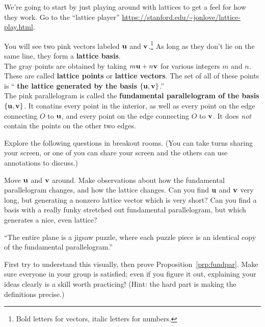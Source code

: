 \noindent
We're going to start by just playing around with lattices to get a feel for how they work. Go to the ``lattice player'' \url{https://stanford.edu/~jonlove/lattice-play.html}.

\begin{defns}
	You will see two pink vectors labeled {\color{magenta}$\mathbf{u}$} and {\color{magenta}$\mathbf{v}$}.\footnote{Bold letters for vectors, italic letters for numbers.} As long as they don't lie on the same line, they form a \textbf{\color{magenta} lattice basis}.
	\\
	
	The gray points are obtained by taking $m\mathbf{u}+n\mathbf{v}$ for various integers $m$ and $n$. These are called \textbf{\color{gray} lattice points} or \textbf{\color{gray} lattice vectors}. The set of all of these points is ``\textbf{\color{gray} the lattice generated by \color{magenta} the basis $\{\mathbf{u},\mathbf{v}\}$}.''
	\\
	
	The pink parallelogram is called the \textbf{\color{magenta} fundamental parallelogram of the basis $\{\mathbf{u},\mathbf{v}\}$}. It conatins every point in the interior, as well as every point on the edge connecting $O$ to $\mathbf{u}$, and every point on the edge connecting $O$ to $\mathbf{v}$. It does \emph{not} contain the points on the other two edges.
\end{defns}

Explore the following questions in breakout rooms. (You can take turns sharing your screen, or one of you can share your screen and the others can use annotations to discuss.)

\begin{explor}
	Move $\mathbf{u}$ and $\mathbf{v}$ around. Make observations about how the fundamental parallelogram changes, and how the lattice changes.  Can you find $\mathbf{u}$ and $\mathbf{v}$ very long, but generating a nonzero lattice vector which is very short? Can you find a basis with a really funky stretched out fundamental parallelogram, but which generates a nice, even lattice?
\end{explor}

\begin{explor}
	``The entire plane is a jigsaw puzzle, where each puzzle piece is an identical copy of the fundamental parallelogram.'' 
	
	First try to understand this visually, then prove Proposition~\ref{prp:fundpar}. Make sure everyone in your group is satisfied; even if you figure it out, explaining your ideas clearly is a skill worth practicing! \color{DarkGreen}(Hint: the hard part is making the definitions precise.)
\end{explor}

